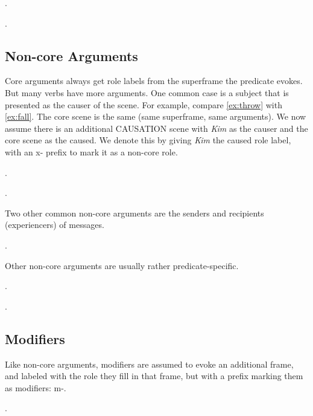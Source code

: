 \documentclass[a4paper]{article}
\newcommand{\fr}[1]{\textsf{#1}}
\newcommand{\rl}[1]{\textsf{#1}}
\begin{document}
\ex.

\ex.

\subsection{Non-core Arguments}

Core arguments always get role labels from the superframe the predicate evokes.
But many verbs have more arguments. One common case is a subject that is
presented as the causer of the scene. For example, compare \ref{ex:throw} with
\ref{ex:fall}. The core scene is the same (same superframe, same arguments). We
now assume there is an additional \fr{CAUSATION} scene with \emph{Kim} as the
\rl{causer} and the core scene as the \rl{caused}. We denote this by giving
\emph{Kim} the \rl{caused} role label, with an \rl{x-} prefix to mark it as a
non-core role.

\ex.\label{ex:throw}

\ex.

Two other common non-core arguments are the senders and recipients (experiencers) of messages.

\ex.

Other non-core arguments are usually rather predicate-specific.

\ex.

\ex.

\subsection{Modifiers}

Like non-core arguments, modifiers are assumed to evoke an additional frame,
and labeled with the role they fill in that frame, but with a prefix marking
them as modifiers: \rl{m-}.

\ex.
\end{document}
